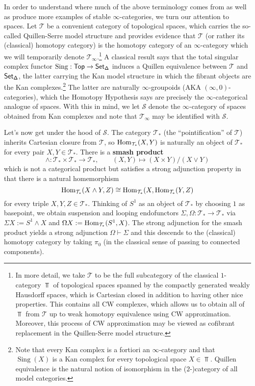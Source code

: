 \documentclass[11pt]{article}
\newcommand{\adj}{\vdash} %
\renewcommand{\S}{\mathcal{S}}
\newcommand{\T}{\mathcal{T}}
\DeclareMathOperator{\Sing}{Sing} %
\newcommand{\DDelta}{\mathbf{\mathsf{\Delta}}} %
\begin{document}
In order to understand where much of the above terminology comes from as well as produce more examples of stable $\infty$-categories, we turn our attention to spaces. Let $\T$ be a convenient category of topological spaces, which carries the so-called Quillen-Serre model structure and provides evidence that $\T$ (or rather its (classical) homotopy category) is the homotopy category of an $\infty$-category which we will temporarily denote $\T_{\infty}$.\footnote{In more detail, we take $\T$ to be the full subcategory of the classical $1$-category $\Top$ of topological spaces spanned by the compactly generated weakly Hausdorff spaces, which is Cartesian closed in addition to having other nice properties. This contains all CW complexes, which allows us to obtain all of $\Top$ from $\T$ up to weak homotopy equivalence using CW approximation. Moreover, this process of CW approximation may be viewed as cofibrant replacement in the Quillen-Serre model structure.} A classical result says that the total singular complex functor $\Sing: \Top\to\Set_{\DDelta}$ induces a Quillen equivalence between $\T$ and $\Set_{\DDelta}$, the latter carrying the Kan model structure in which the fibrant objects are the Kan complexes.\footnote{Note that every Kan complex is a fortiori an $\infty$-category and that $\Sing(X)$ is a Kan complex for every topological space $X\in\Top$. Quillen equivalence is the natural notion of isomorphism in the ($2$-)category of all model categories.} The latter are naturally $\infty$-groupoids (AKA $(\infty,0)$-categories), which the Homotopy Hypothesis says are precisely the $\infty$-categorical analogue of spaces. With this in mind, we let $\S$ denote the $\infty$-category of spaces obtained from Kan complexes and note that $\T_{\infty}$ may be identified with $\S$.

Let's now get under the hood of $\S$. The category $\T_*$ (the ``pointification'' of $\T$) inherits Cartesian closure from $\T$, so $\Hom_{\T_*}(X,Y)$ is naturally an object of $\T_*$ for every pair $X,Y\in\T_*$. There is a \textbf{smash product} 
$$\wedge: \T_*\times\T_*\to\T_*,\qquad (X,Y)\mapsto(X\times Y)/(X\vee Y)$$
which is not a categorical product but satisfies a strong adjunction property in that there is a natural homemorphism
$$\Hom_{\T_*}(X\wedge Y,Z)\iso\Hom_{\T_*}(X,\Hom_{\T_*}(Y,Z)$$
for every triple $X,Y,Z\in\T_*$. Thinking of $S^1$ as an object of $\T_*$ by choosing $1$ as basepoint, we obtain suspension and looping endofunctors $\Sigma,\Omega: \T_*\to\T_*$ via $\Sigma X:=S^1\wedge X$ and $\Omega X:=\Hom_{\T_*}(S^1,X)$. The strong adjunction for the smash product yields a strong adjunction $\Omega\adj\Sigma$ and this descends to the (classical) homotopy category by taking $\pi_0$ (in the classical sense of passing to connected components). 
\end{document}
